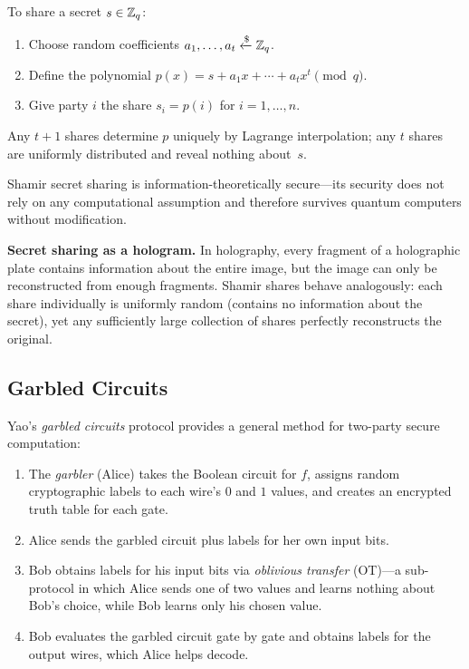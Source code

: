 \begin{definition}
\label{def:shamir}
To share a secret $s \in \mathbb{Z}_q$:
\begin{enumerate}
\item Choose random coefficients $a_1, \ldots, a_t \getsr \Zq$.
\item Define the polynomial $p(x) = s + a_1 x + \cdots + a_t x^t \pmod{q}$.
\item Give party $i$ the share $s_i = p(i)$ for $i = 1, \ldots, n$.
\end{enumerate}
Any $t+1$ shares determine $p$ uniquely by Lagrange interpolation; any $t$ shares are uniformly distributed and reveal nothing about~$s$.
\end{definition}

Shamir secret sharing is information-theoretically secure---its security does not rely on any computational assumption and therefore survives quantum computers without modification.

\begin{svgraybox}
\textbf{Secret sharing as a hologram.}
In holography, every fragment of a holographic plate contains information about the entire image, but the image can only be reconstructed from enough fragments.  Shamir shares behave analogously: each share individually is uniformly random (contains no information about the secret), yet any sufficiently large collection of shares perfectly reconstructs the original.
\end{svgraybox}


\subsection{Garbled Circuits}
\label{subsec:garbled-circuits}

Yao's \emph{garbled circuits} protocol provides a general method for two-party secure computation:

\begin{enumerate}
\item The \emph{garbler} (Alice) takes the Boolean circuit for $f$, assigns random cryptographic labels to each wire's $0$ and $1$ values, and creates an encrypted truth table for each gate.
\item Alice sends the garbled circuit plus labels for her own input bits.
\item Bob obtains labels for his input bits via \emph{oblivious transfer} (OT)---a sub-protocol in which Alice sends one of two values and learns nothing about Bob's choice, while Bob learns only his chosen value.
\item Bob evaluates the garbled circuit gate by gate and obtains labels for the output wires, which Alice helps decode.
\end{enumerate}

